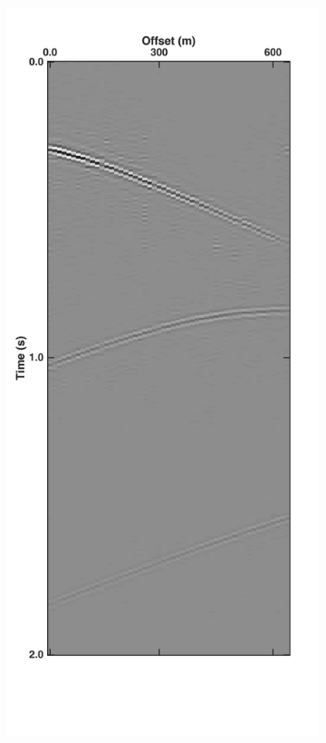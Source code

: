 \begin{figure}
\begin{subfigure}[t]{0.24\textwidth}
		\caption{}
		\label{fig:Ch-Results-Debl-inline10-x}
	\end{subfigure}
	\centering
	\begin{subfigure}[t]{0.24\textwidth}
		\centering
		\includegraphics[height = 0.38\textheight]{Plots/BlendingPatterns/Deblended_inline10t}

\end{subfigure}
\end{figure}
